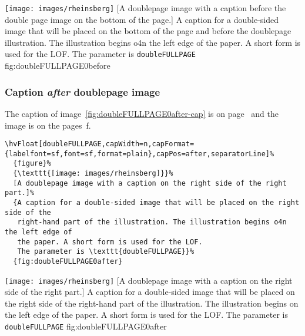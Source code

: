 \documentclass[twoside]{scrartcl}
\let\hvBlindtext\Blindtext
\def\Blindtext{\par\color{black!40}\hvBlindtext\par\normalcolor}
\begin{document}
%
  {\texttt{[image: images/rheinsberg]}}%
  [A doublepage image with a caption before the double page image on the bottom of the page.]%
  {A caption for a double-sided image that will be placed on the bottom of the page and before
   the doublepage illustration. The illustration begins o4n the left edge of 
   the paper. A short form is used for the LOF. 
   The parameter is \texttt{doubleFULLPAGE}}%
  {fig:doubleFULLPAGE0before}

\Blindtext

\Blindtext


\subsubsection{Caption \emph{after} doublepage image}
The caption of image~\ref{fig:doubleFULLPAGE0after-cap} is on page~\pageref{fig:doubleFULLPAGE0after-cap} and the image
is on the pages~\pageref{fig:doubleFULLPAGE0after}f.

\begin{lstlisting}
\hvFloat[doubleFULLPAGE,capWidth=n,capFormat={labelfont=sf,font=sf,format=plain},capPos=after,separatorLine]%
  {figure}%
  {\texttt{[image: images/rheinsberg]}}%
  [A doublepage image with a caption on the right side of the right part.]%
  {A caption for a double-sided image that will be placed on the right side of the
   right-hand part of the illustration. The illustration begins o4n the left edge of 
   the paper. A short form is used for the LOF. 
   The parameter is \texttt{doubleFULLPAGE}}%
  {fig:doubleFULLPAGE0after}
\end{lstlisting}


%
  {\texttt{[image: images/rheinsberg]}}%
  [A doublepage image with a caption on the right side of the right part.]%
  {A caption for a double-sided image that will be placed on the right side of the
   right-hand part of the illustration. The illustration begins on the left edge of 
   the paper. A short form is used for the LOF. 
   The parameter is \texttt{doubleFULLPAGE}}%
  {fig:doubleFULLPAGE0after}
\end{document}

